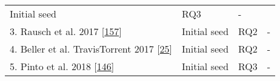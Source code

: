 \documentclass[]{book}
\begin{document}
\begin{longtable}[]{@{}llll@{}}
\begin{minipage}[t]{0.20\columnwidth}
Initial seed\strut
\end{minipage} & \begin{minipage}[t]{0.14\columnwidth}\raggedright\strut
RQ3\strut
\end{minipage} & \begin{minipage}[t]{0.06\columnwidth}\raggedright\strut
-\strut
\end{minipage}\tabularnewline
\begin{minipage}[t]{0.48\columnwidth}\raggedright\strut
3. Rausch et al. 2017
{[}\protect\hyperlink{ref-rausch2017empirical}{157}{]}\strut
\end{minipage} & \begin{minipage}[t]{0.20\columnwidth}\raggedright\strut
Initial seed\strut
\end{minipage} & \begin{minipage}[t]{0.14\columnwidth}\raggedright\strut
RQ2\strut
\end{minipage} & \begin{minipage}[t]{0.06\columnwidth}\raggedright\strut
-\strut
\end{minipage}\tabularnewline
\begin{minipage}[t]{0.48\columnwidth}\raggedright\strut
4. Beller et al. TravisTorrent 2017
{[}\protect\hyperlink{ref-beller2017travistorrent}{25}{]}\strut
\end{minipage} & \begin{minipage}[t]{0.20\columnwidth}\raggedright\strut
Initial seed\strut
\end{minipage} & \begin{minipage}[t]{0.14\columnwidth}\raggedright\strut
RQ2\strut
\end{minipage} & \begin{minipage}[t]{0.06\columnwidth}\raggedright\strut
-\strut
\end{minipage}\tabularnewline
\begin{minipage}[t]{0.48\columnwidth}\raggedright\strut
5. Pinto et al. 2018
{[}\protect\hyperlink{ref-pinto2018work}{146}{]}\strut
\end{minipage} & \begin{minipage}[t]{0.20\columnwidth}\raggedright\strut
Initial seed\strut
\end{minipage} & \begin{minipage}[t]{0.14\columnwidth}\raggedright\strut
RQ3\strut
\end{minipage} & \begin{minipage}[t]{0.06\columnwidth}\raggedright\strut
-\strut
\end{minipage}\tabularnewline

\end{longtable}
\end{document}
